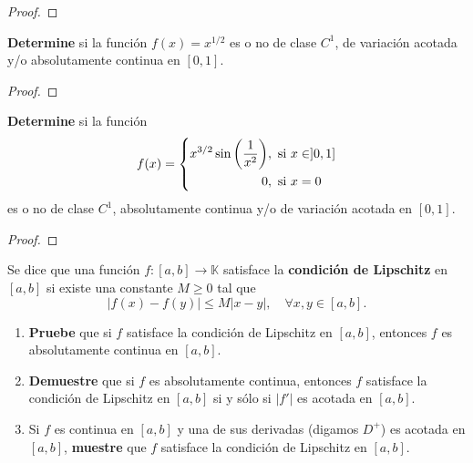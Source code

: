 \documentclass[12pt]{report}
\theoremstyle{largebreak}
\newcommand\abs[1]{\ensuremath{\lvert#1\rvert}}
\begin{document}
    \begin{proof}
        
    \end{proof}

    \begin{excer}
        \textbf{Determine} si la función $f(x)=x^{1/2}$ es o no de clase $C^1$, de variación acotada y/o absolutamente continua en $[0,1]$.
    \end{excer}

    \begin{proof}
        
    \end{proof}

    \begin{excer}
        \textbf{Determine} si la función
        \begin{equation*}
            f(x) = 
                \left \{
                    \begin{aligned}
                    x^{3/2}\sin\left(\frac{1}{x^2}\right) &,\ \textup{si} \ x \in ]0,1]\\
                    0 &,\ \textup{si} \ x=0
                    \end{aligned}
                \right .
        \end{equation*}
        es o no de clase $C^1$, absolutamente continua y/o de variación acotada en $[0,1]$.
    \end{excer}

    \begin{proof}
        
    \end{proof}

    \begin{excer}
        Se dice que una función $f:[a,b]\rightarrow \mathbb{K}$ satisface la \textbf{condición de Lipschitz} en $[a,b]$ si existe una constante $M\geq 0$ tal que
        \begin{equation*}
            \abs{f(x)-f(y)}\leq M\abs{x-y},\quad\forall x,y\in [a,b].
        \end{equation*}
        \begin{enumerate}
            \item \textbf{Pruebe} que si $f$ satisface la condición de Lipschitz en $[a,b]$, entonces $f$ es absolutamente continua en $[a,b]$.
            \item \textbf{Demuestre} que si $f$ es absolutamente continua, entonces $f$ satisface la condición de Lipschitz en $[a,b]$ si y sólo si $\abs{f'}$ es acotada en $[a,b]$.
            \item Si $f$ es continua en $[a,b]$ y una de sus derivadas (digamos $D^+$) es acotada en $[a,b]$, \textbf{muestre} que $f$ satisface la condición de Lipschitz en $[a,b]$.
        \end{enumerate}
    \end{excer}
\end{document}
